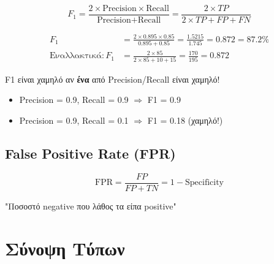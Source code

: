 \begin{formulabox}[F1 Score]
\begin{equation}
F_1 = \frac{2 \times \text{Precision} \times \text{Recall}}{\text{Precision} + \text{Recall}} = \frac{2 \times TP}{2 \times TP + FP + FN}
\end{equation}
\end{formulabox}

\begin{examplebox}
\begin{align*}
F_1 &= \frac{2 \times 0.895 \times 0.85}{0.895 + 0.85} = \frac{1.5215}{1.745} = 0.872 = 87.2\% \\[0.5em]
\text{Εναλλακτικά}: F_1 &= \frac{2 \times 85}{2 \times 85 + 10 + 15} = \frac{170}{195} = 0.872
\end{align*}
\end{examplebox}

\begin{infobox}[Ιδιότητα F1]
F1 είναι χαμηλό αν \textbf{ένα} από Precision/Recall είναι χαμηλό!
\begin{itemize}
    \item Precision = 0.9, Recall = 0.9 $\Rightarrow$ F1 = 0.9
    \item Precision = 0.9, Recall = 0.1 $\Rightarrow$ F1 = 0.18 (χαμηλό!)
\end{itemize}
\end{infobox}

\subsection{False Positive Rate (FPR)}

\begin{formulabox}
\begin{equation}
\text{FPR} = \frac{FP}{FP + TN} = 1 - \text{Specificity}
\end{equation}

"Ποσοστό negative που λάθος τα είπα positive"
\end{formulabox}

\section{Σύνοψη Τύπων}

